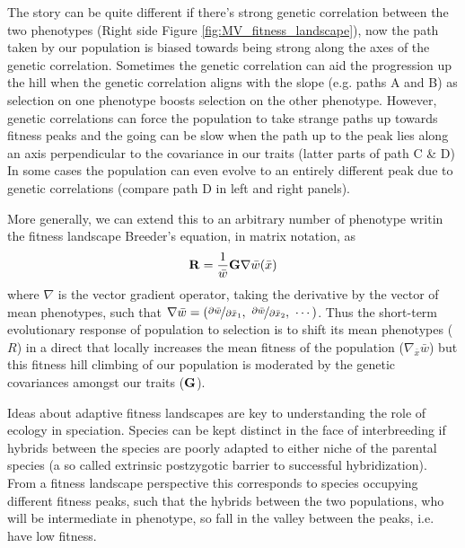 The story can be quite different if there's strong genetic correlation
between the two phenotypes (Right side Figure
\ref{fig:MV_fitness_landscape}), now the path taken by our population
is biased towards being strong along the axes of the genetic
correlation. Sometimes the genetic correlation can aid the progression
up the hill when the genetic correlation aligns with the slope
(e.g. paths A and B) as
selection on one phenotype boosts selection on the other
phenotype. However, genetic correlations can force the population to
take strange paths up towards fitness peaks and the going can be slow
when the path up to the peak lies along an axis perpendicular to the
covariance in our traits (latter parts of path C \& D)
In some cases the population can even evolve to an entirely different
peak due to genetic correlations (compare path D in left and
right panels). 

More generally, we can extend this to an arbitrary number of phenotype
writin the fitness landscape Breeder's equation, in matrix notation, as 
\begin{equation}
{\bf R}  = \frac{1}{\bar{w}} {\bf G} \nabla \bar{w} ({\bar{x}})
\end{equation} 
where $\nabla$ is the vector gradient operator, taking the
derivative by the vector of mean phenotypes, such that
$\nabla \bar{w} =
\left( \nicefrac{\partial \bar{w}}{\partial \bar{x}_1},~
  \nicefrac{\partial \bar{w}}{\partial \bar{x}_2},~\cdots
\right)$. Thus the short-term evolutionary response of population to
selection is to shift its mean phenotypes ($R$) in a direct that
locally increases the mean fitness of the population
($\nabla_{\bar{x}} \bar{w}$) but this fitness hill climbing of our
population is moderated by the genetic covariances amongst our traits
(${\bf G}$).

Ideas about adaptive fitness landscapes are key to understanding the role of ecology in speciation. Species can be kept distinct in the face of interbreeding if hybrids between the species are poorly adapted to either niche of the parental species (a so called extrinsic postzygotic barrier to successful hybridization). From a fitness landscape perspective this corresponds to species occupying different fitness peaks, such that the hybrids between the two populations, who will be intermediate in phenotype, so fall in the valley between the peaks, i.e. have low fitness. 



